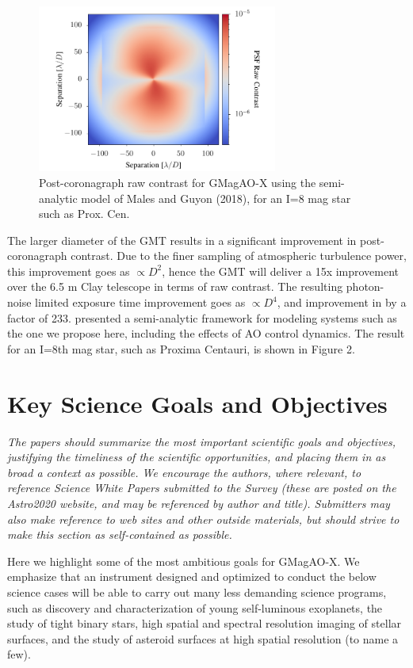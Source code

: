 \documentclass[12pt,preprint]{aastex}
\begin{document}
\begin{figure}
\centering
\vspace{-0.4in}
\includegraphics[width=3.1in]{figures/fig2.pdf}
\vspace{-0.2in}
\caption{ Post-coronagraph raw contrast for GMagAO-X using the semi-analytic model of Males and Guyon (2018), for an I=8 mag star such as Prox. Cen.   \label{fig:contrast} }
\end{figure}

The larger diameter of the GMT results in a significant improvement in post-coronagraph contrast. Due to the finer sampling of atmospheric turbulence power, this improvement goes as $\propto D^2$, hence the GMT will deliver a 15x improvement over the 6.5 m Clay telescope in terms of raw contrast.  The resulting photon-noise limited exposure time improvement goes as $\propto D^4$, and improvement in by a factor of 233.  \citet{2018JATIS...4a9001M} presented a semi-analytic framework for modeling systems such as the one we propose here, including the effects of AO control dynamics.  The result for an I=8th mag star, such as Proxima Centauri, is shown in Figure 2.

\section{Key Science Goals and Objectives}
\textit{The papers should summarize the most important
scientific goals and objectives, justifying the timeliness of the scientific opportunities, and
placing them in as broad a context as possible. We encourage the authors, where relevant, to
reference Science White Papers submitted to the Survey (these are posted on the Astro2020
website, and may be referenced by author and title). Submitters may also make reference to
web sites and other outside materials, but should strive to make this section as self-contained
as possible.}

Here we highlight some of the most ambitious goals for GMagAO-X.  We emphasize that an instrument designed and optimized to conduct the below science cases will be able to carry out many less demanding science programs, such as discovery and characterization of young self-luminous exoplanets, the study of tight binary stars, high spatial and spectral resolution imaging of stellar surfaces, and the study of asteroid surfaces at high spatial resolution (to name a few).
\end{document}

